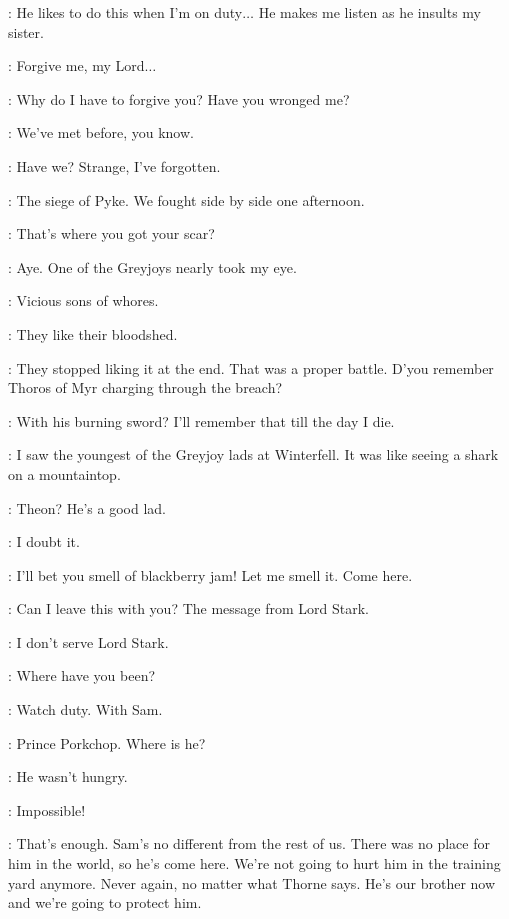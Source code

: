 \JAIME: He likes to do this when I'm on duty$\ldots$ He makes me listen as he insults my sister. 

\JORY: Forgive me, my Lord$\ldots$ 

\JAIME: Why do I have to forgive you? Have you wronged me? 

\JORY: We've met before, you know. 

\JAIME: Have we? Strange, I've forgotten. 

\JORY: The siege of Pyke. We fought side by side one afternoon. 

\JAIME: That's where you got your scar? 

\JORY: Aye. One of the Greyjoys nearly took my eye. 

\JAIME: Vicious sons of whores. 

\JORY: They like their bloodshed. 

\JAIME: They stopped liking it at the end. That was a proper battle. D'you remember Thoros of Myr charging through the breach? 

\JORY: With his burning sword? I'll remember that till the day I die. 

\JAIME: I saw the youngest of the Greyjoy lads at Winterfell. It was like seeing a shark on a mountaintop. 

\JORY: Theon? He's a good lad. 

\JAIME: I doubt it. 

\ROBERT:  I'll bet you smell of blackberry jam! Let me smell it. Come here. 

\JORY: Can I leave this with you? The message from Lord Stark. 

\JAIME: I don't serve Lord Stark. 

\scene



\GRENN: Where have you been? 

\JON: Watch duty. With Sam. 

\PYP: Prince Porkchop. Where is he? 

\JON: He wasn't hungry. 

\PYP: Impossible! 

\JON: That's enough. Sam's no different from the rest of us. There was no place for him in the world, so he's come here. We're not going to hurt him in the training yard anymore. Never again, no matter what Thorne says. He's our brother now and we're going to protect him. 

